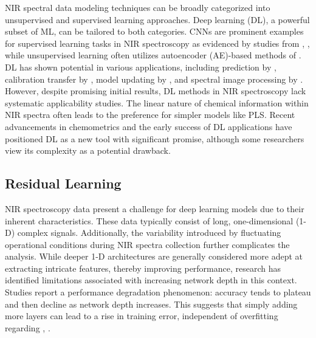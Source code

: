 \documentclass[10pt, a4paper, oneside]{article}
\begin{document}
NIR spectral data modeling techniques can be broadly categorized into unsupervised and supervised learning approaches. Deep learning (DL), a powerful subset of ML, can be tailored to both categories. CNNs are prominent examples for supervised learning tasks in NIR spectroscopy as evidenced by studies from \cite{cui2018modern}, \cite{malek2018one}, while unsupervised learning often utilizes autoencoder (AE)-based methods of \cite{yu2018deep}. DL has shown potential in various applications, including prediction by \cite{zhang2019deepspectra}, calibration transfer by \cite{mishra2021deep}, model updating by \cite{mishra2021realizing}, and spectral image processing by \cite{mishra2021gan}. However, despite promising initial results, DL methods in NIR spectroscopy lack systematic applicability studies. The linear nature of chemical information within NIR spectra often leads to the preference for simpler models like PLS. Recent advancements in chemometrics and the early success of DL applications have positioned DL as a new tool with significant promise, although some researchers view its complexity as a potential drawback.

\subsection{Residual Learning}
NIR spectroscopy data present a challenge for deep learning models due to their inherent characteristics. These data typically consist of long, one-dimensional (1-D) complex signals. Additionally, the variability introduced by fluctuating operational conditions during NIR spectra collection further complicates the analysis. While deeper 1-D architectures are generally considered more adept at extracting intricate features, thereby improving performance, research has identified limitations associated with increasing network depth in this context. Studies report a performance degradation phenomenon: accuracy tends to plateau and then decline as network depth increases. This suggests that simply adding more layers can lead to a rise in training error, independent of overfitting regarding \cite{srivastava2015highway}, \cite{he2015convolutional}.
 
\end{document}
